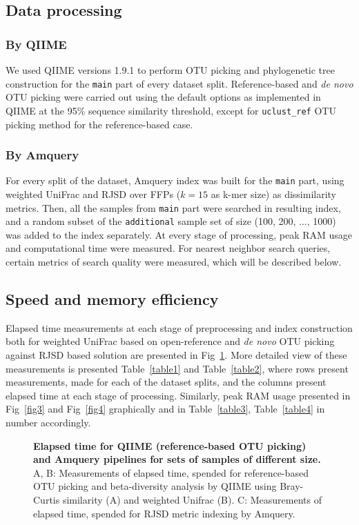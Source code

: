 \documentclass[10pt,letterpaper]{article}
\begin{document}
\subsection*{Data processing}

\subsubsection*{By QIIME}
We used QIIME versions 1.9.1 to perform OTU picking and phylogenetic tree construction for the \texttt{main} part of every dataset split.
Reference-based and \textit{de novo} OTU picking were carried out using the default options as implemented in QIIME at the 95\% sequence similarity threshold, 
except for \texttt{uclust\_ref} OTU picking method for the reference-based case.

\subsubsection*{By Amquery}
For every split of the dataset, Amquery index was built for the \texttt{main} part, using weighted UniFrac and RJSD over FFPs ($k=15$ as k-mer size) as dissimilarity metrics.
Then, all the samples from \texttt{main} part were searched in resulting index, and a random subset of the \texttt{additional} sample set of size (100, 200, $\dots$, 1000) was added to the index separately. 
At every stage of processing, peak RAM usage and computational time were measured. For nearest neighbor search queries, certain metrics of search quality were measured, which will be described below. 

\subsection*{Speed and memory efficiency}
Elapsed time measurements at each stage of preprocessing and index construction 
both for weighted UniFrac based on open-reference and \textit{de novo} OTU picking against RJSD based solution 
are presented in Fig~\ref{fig1}.
More detailed view of these measurements is presented Table~\ref{table1} and Table~\ref{table2},
where rows present measurements, made for each of the dataset splits, and the columns present elapsed time at each stage of processing. 
Similarly, peak RAM usage presented in Fig~\ref{fig3} and Fig~\ref{fig4} graphically and in Table~\ref{table3}, Table~\ref{table4} in number accordingly.


\begin{figure}[!h]
\caption{{\bf Elapsed time for QIIME (reference-based OTU picking) and Amquery pipelines for sets of samples of different size.}
A, B: Measurements of elapsed time, spended for reference-based OTU picking and beta-diversity analysis by QIIME using Bray-Curtis similarity (A) and weighted Unifrac (B). 
C: Measurements of elapsed time, spended for RJSD metric indexing by Amquery.}
\label{fig1}
\end{figure}
\end{document}
